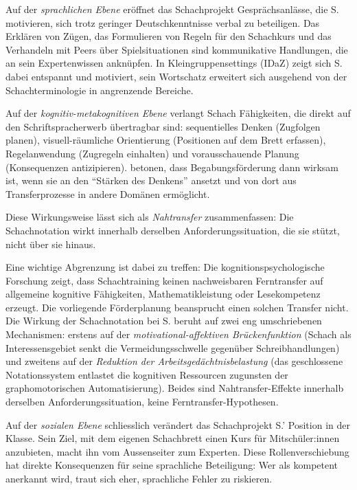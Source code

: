 \documentclass[ngerman, a4paper]{article}
\begin{document}
Auf der \textit{sprachlichen Ebene} eröffnet das Schachprojekt Gesprächsanlässe, die
S. motivieren, sich trotz geringer Deutschkenntnisse verbal zu beteiligen. Das
Erklären von Zügen, das Formulieren von Regeln für den Schachkurs und das
Verhandeln mit Peers über Spielsituationen sind kommunikative Handlungen, die an
sein Expertenwissen anknüpfen. In Kleingruppensettings (IDaZ) zeigt sich S. dabei
entspannt und motiviert, sein Wortschatz erweitert sich ausgehend von der
Schachterminologie in angrenzende Bereiche.

Auf der \textit{kognitiv-metakognitiven Ebene} verlangt Schach Fähigkeiten, die
direkt auf den Schriftspracherwerb übertragbar sind: sequentielles Denken
(Zugfolgen planen), visuell-räumliche Orientierung (Positionen auf dem Brett
erfassen), Regelanwendung (Zugregeln einhalten) und vorausschauende Planung
(Konsequenzen antizipieren). \textcite[S.\,112--113]{hoyer2013begabung} betonen, dass
Begabungsförderung dann wirksam ist, wenn sie an den
\enquote{Stärken des Denkens} ansetzt und von dort aus Transferprozesse
in andere Domänen ermöglicht.

Diese Wirkungsweise lässt sich als \textit{Nahtransfer} zusammenfassen:
Die Schachnotation wirkt innerhalb derselben Anforderungssituation, die
sie stützt, nicht über sie hinaus.

Eine wichtige Abgrenzung ist dabei zu treffen: Die kognitionspsychologische
Forschung zeigt, dass Schachtraining keinen nachweisbaren Ferntransfer
auf allgemeine kognitive Fähigkeiten, Mathematikleistung oder
Lesekompetenz erzeugt. Die vorliegende Förderplanung beansprucht
einen solchen Transfer nicht. Die Wirkung der Schachnotation bei S.
beruht auf zwei eng umschriebenen Mechanismen: erstens auf der
\textit{motivational-affektiven Brückenfunktion} (Schach als
Interessensgebiet senkt die Vermeidungsschwelle gegenüber
Schreibhandlungen) und zweitens auf der \textit{Reduktion der
Arbeitsgedächtnisbelastung} (das geschlossene Notationssystem entlastet
die kognitiven Ressourcen zugunsten der graphomotorischen Automatisierung).
Beides sind Nahtransfer-Effekte innerhalb derselben Anforderungssituation,
keine Ferntransfer-Hypothesen.

Auf der \textit{sozialen Ebene} schliesslich verändert das Schachprojekt S.' Position
in der Klasse. Sein Ziel, mit dem eigenen Schachbrett einen Kurs für Mitschüler:innen
anzubieten, macht ihn vom Aussenseiter zum Experten. Diese Rollenverschiebung hat
direkte Konsequenzen für seine sprachliche Beteiligung: Wer als kompetent anerkannt
wird, traut sich eher, sprachliche Fehler zu riskieren.
\end{document}
